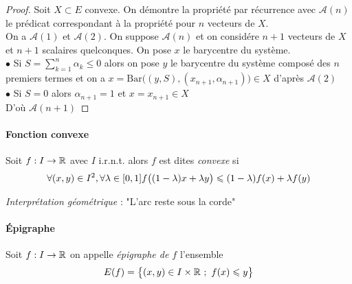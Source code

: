 	\newpage
	
	 \medskip
	
    
    \begin{proof}
    Soit $X\subset E$ convexe. On démontre la propriété par récurrence avec $\mathcal{A}(n)$ le prédicat correspondant à la propriété pour $n$ vecteurs de $X$. \\
    On a $\mathcal{A}(1)$ et $\mathcal{A}(2)$. On suppose $\mathcal{A}(n)$ et on considére $n+1$ vecteurs de $X$ et $n+1$ scalaires quelconques. On pose $x$ le barycentre du système. \\
    $\bullet $ Si $S = \sum_{k=1}^n \alpha_k \leqslant 0$ alors on pose $y$ le barycentre du système composé des $n$ premiers termes et on a $x= \mathrm{Bar} \big( (y,S),(x_{n+1},\alpha_{n+1}) \big) \in X$ d'après $\mathcal{A}(2)$ \\
    $\bullet $ Si $S=0$ alors $\alpha_{n+1} = 1$ et $x=x_{n+1} \in X$ \\
    D'où $\mathcal{A}(n+1)$
    \end{proof}
    
    \traitd
    \paragraph{Fonction convexe}
        Soit $f:I\rightarrow {\mathbb{R}}$ avec $I$ i.r.n.t. alors $f$ est dites \emph{convexe} si 
		\[
        		\forall (x,y) \in I^2, \forall \lambda\in [0,1] \\ f\big( (1-\lambda )x + \lambda y \big) \leqslant (1-\lambda )f(x) + \lambda f(y)
        	\vspace{-25pt}
        \] 
    \trait 
    
    {\emph{Interprétation géométrique} : "L'arc reste sous la corde"} 
    
    \traitd
    \paragraph{Épigraphe}
        Soit $f:I\rightarrow {\mathbb{R}}$ on appelle \emph{épigraphe de $f$} l'ensemble 
        \[
        		E(f)=\big\{(x,y)\in I\times\R ~;~f(x)\leqslant y\big\}
        	\vspace{-25pt}
        	\]
    \trait
    
    

